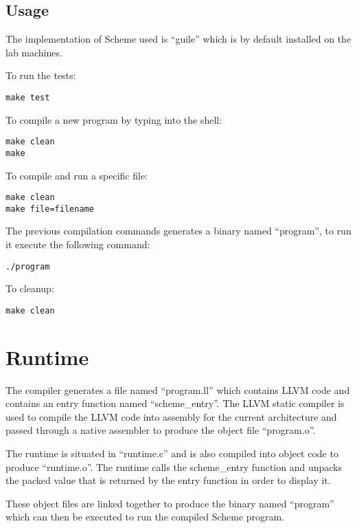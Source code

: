 \documentclass{article}
\begin{document}
\subsection{Usage}

The implementation of Scheme used is ``guile'' which is by default installed on the lab machines.

To run the tests:

\begin{verbatim}
make test
\end{verbatim}

To compile a new program by typing into the shell:

\begin{verbatim}
make clean
make
\end{verbatim}

To compile and run a specific file:

\begin{verbatim}
make clean
make file=filename
\end{verbatim}

The previous compilation commands generates a binary named ``program'', to run it execute the following command:

\begin{verbatim}
./program
\end{verbatim}

To cleanup:

\begin{verbatim}
make clean
\end{verbatim}

\section{Runtime}

The compiler generates a file named ``program.ll'' which contains LLVM code and contains an entry function named ``scheme\_entry''. The LLVM static compiler is used to compile the LLVM code into assembly for the current architecture and passed through a native assembler to produce the object file ``program.o''.

The runtime is situated in ``runtime.c'' and is also compiled into object code to produce ``runtime.o''. The runtime calls the scheme\_entry function and unpacks the packed value that is returned by the entry function in order to display it. 

These object files are linked together to produce the binary named ``program'' which can then be executed to run the compiled Scheme program.
\end{document}
